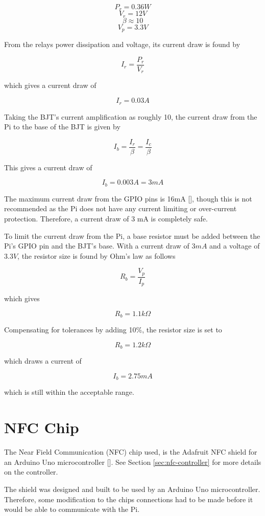 \[ P_{r} = 0.36W\]
\[ V_{r} = 12V\]
\[ \beta \approx 10\]
\[ V_{p} = 3.3V\]

From the relays power dissipation and voltage, its current draw is found by

\[
I_{r} = \frac{P_{r}}{V_{r}}
\]

which gives a current draw of

\[
I_{r} = 0.03A
\]

Taking the BJT's current amplification as roughly 10, the current draw from the Pi to the
base of the BJT is given by

\[
I_{b} = \frac{I_{r}}{\beta} = \frac{I_{c}}{\beta}
\]

This gives a current draw of

\[
I_{b} = 0.003A = 3mA
\]

The maximum current draw from the GPIO pins is 16mA [\cite{website:gpio-specs}], though this is
not recommended as the Pi does not have any current limiting or over-current protection.
Therefore, a current draw of 3 mA is completely safe.

To limit the current draw from the Pi, a base resistor must be added between the Pi's GPIO pin
and the BJT's base. With a current draw of $3mA$ and a voltage of $3.3V$, the resistor size is
found by Ohm's law as follows

\[
R_{b} = \frac{V_{p}}{I_{p}}
\]

which gives

\[
R_{b} = 1.1k\Omega
\]

Compensating for tolerances by adding 10\%, the resistor size is set to

\[R_{b} = 1.2k\Omega\]

which draws a current of 

\[I_{b} = 2.75 mA \]

which is still within the acceptable range.

\section{NFC Chip}

The Near Field Communication (NFC) chip used, is the Adafruit NFC shield for an
Arduino Uno microcontroller [\cite{website:adafruit-nfc}]. See Section
\ref{sec:nfc-controller} for more details on the controller.

The shield was designed and built to be used by an Arduino Uno microcontroller.
Therefore, some modification to the chips connections had to be made before it
would be able to communicate with the Pi.

